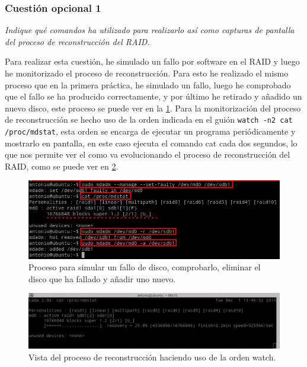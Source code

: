 \subsubsection{Cuestión opcional 1}
\textit{Indique qué comandos ha utilizado para realizarlo así como capturas de pantalla del proceso de reconstrucción del RAID.}
\newline

Para realizar esta cuestión, he simulado un fallo por software en el RAID y luego he monitorizado el proceso de reconstrucción. Para esto he realizado el mismo proceso que en la primera práctica, he simulado un fallo, luego he comprobado que el fallo se ha producido correctamente, y por último he retirado y añadido un nuevo disco, este proceso se puede ver en la \cref{fig18}\cite{fault}. Para la monitorización del proceso de reconstrucción se hecho uso de la orden indicada en el guión \texttt{watch -n2 cat /proc/mdstat}, esta orden se encarga de ejecutar un programa periódicamente y mostrarlo en pantalla\cite{watch}, en este caso ejecuta el comando cat cada dos segundos, lo que nos permite ver el como va evolucionando el proceso de reconstrucción del RAID, como se puede ver en \cref{fig19}.

\begin{figure}[H]
  \begin{center}
    \includegraphics[width=1\textwidth]{imagenes/mdadm}
    \caption{Proceso para simular un fallo de disco, comprobarlo, eliminar el disco que ha fallado y añadir uno nuevo.}
    \label{fig18}
  \end{center}
\end{figure}

\begin{figure}[H]
  \begin{center}
    \includegraphics[width=1\textwidth]{imagenes/watch}
    \caption{Vista del proceso de reconstrucción haciendo uso de la orden watch.}
    \label{fig19}
  \end{center}
\end{figure}


